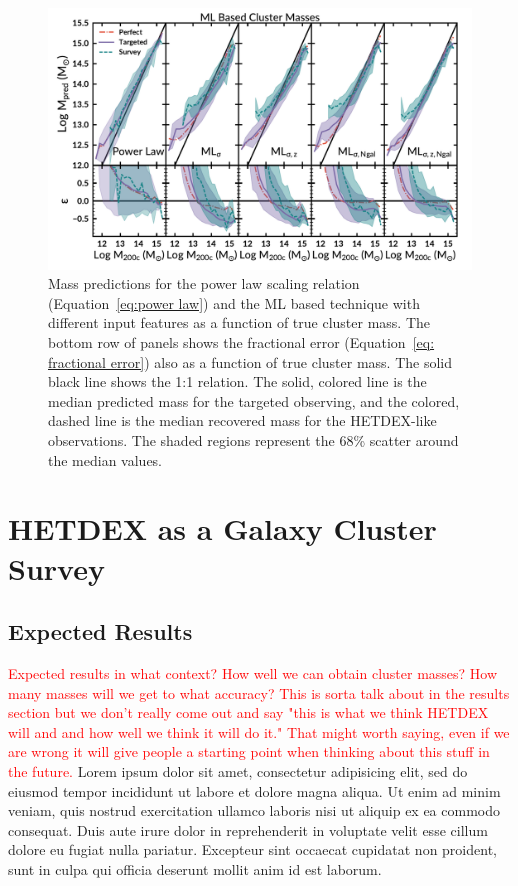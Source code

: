 \documentclass[fleqn,usenatbib]{mnras}
\newcommand{\editorial}[1]{\textcolor{red}{#1}}
\begin{document}
\begin{figure} 
	\includegraphics[width=\textwidth]{figures/MLcomparison.pdf} 
	\caption{Mass predictions for the power law scaling relation (Equation~\ref{eq:power law}) and the ML based technique with different input features as a function of true cluster mass. The bottom row of panels shows the fractional error (Equation~\ref{eq: fractional error}) also as a function of true cluster mass. The solid black line shows the 1:1 relation. The solid, colored line is the median predicted mass for the targeted observing, and the colored, dashed line is the median recovered mass for the HETDEX-like observations. The shaded regions represent the 68\% scatter around the median values.} \label{fig: ML comparison} 
\end{figure}


\section{HETDEX as a Galaxy Cluster Survey}\label{sec:discussion}

\subsection{Expected Results}
\editorial{Expected results in what context? How well we can obtain cluster masses? How many masses will we get to what accuracy? This is sorta talk about in the results section but we don't really come out and say "this is what we think HETDEX will and and how well we think it will do it." That might worth saying, even if we are wrong it will give people a starting point when thinking about this stuff in the future.}
Lorem ipsum dolor sit amet, consectetur adipisicing elit, sed do eiusmod tempor incididunt ut labore et dolore magna aliqua. Ut enim ad minim veniam, quis nostrud exercitation ullamco laboris nisi ut aliquip ex ea commodo consequat. Duis aute irure dolor in reprehenderit in voluptate velit esse cillum dolore eu fugiat nulla pariatur. Excepteur sint occaecat cupidatat non proident, sunt in culpa qui officia deserunt mollit anim id est laborum.
\end{document}
